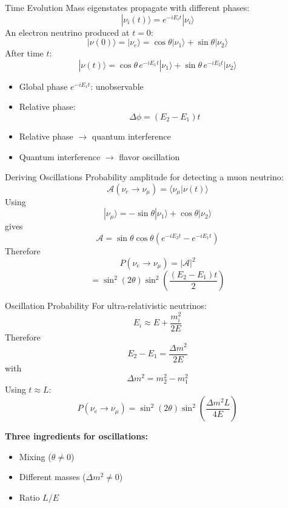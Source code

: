 \documentclass{beamer}
\begin{document}
\begin{frame}{Time Evolution}
Mass eigenstates propagate with different phases:
\[
|\nu_i(t)\rangle
=
e^{-iE_it}
|\nu_i\rangle
\]
An electron neutrino produced at $t=0$:
\[
|\nu(0)\rangle
=
|\nu_e\rangle
=
\cos\theta |\nu_1\rangle
+
\sin\theta |\nu_2\rangle
\]
After time $t$:
\[
|\nu(t)\rangle
=
\cos\theta\,e^{-iE_1t}|\nu_1\rangle
+
\sin\theta\,e^{-iE_2t}|\nu_2\rangle
\]


\begin{itemize}
    \item Global phase $e^{-iE_1t}$: unobservable
    \item Relative phase:
    \[
    \Delta\phi=(E_2-E_1)t
    \]
    \item Relative phase $\rightarrow$ quantum interference
    \item Quantum interference $\rightarrow$ flavor oscillation
\end{itemize}
\end{frame}

\begin{frame}{Deriving Oscillations}
Probability amplitude for detecting a muon neutrino:
\[
\mathcal{A}(\nu_e\rightarrow\nu_\mu)
=
\langle\nu_\mu|\nu(t)\rangle
\]
Using
\[
|\nu_\mu\rangle
=
-\sin\theta |\nu_1\rangle
+
\cos\theta |\nu_2\rangle
\]
gives
\[
\mathcal{A}
=
\sin\theta\cos\theta
\left(
e^{-iE_2t}
-
e^{-iE_1t}
\right)
\]
Therefore
\[
P(\nu_e\rightarrow\nu_\mu)
=
|\mathcal{A}|^2
\]
\[
=
\sin^2(2\theta)
\sin^2\left(
\frac{(E_2-E_1)t}{2}
\right)
\]
\end{frame}

\begin{frame}{Oscillation Probability}
For ultra-relativistic neutrinos:
\[
E_i
\approx
E+\frac{m_i^2}{2E}
\]
Therefore
\[
E_2-E_1
=
\frac{\Delta m^2}{2E}
\]
with
\[
\Delta m^2
=
m_2^2-m_1^2
\]
Using $t\approx L$:
\[
P(\nu_e\rightarrow\nu_\mu)
=
\sin^2(2\theta)
\sin^2\left(
\frac{\Delta m^2L}{4E}
\right)
\]

\vspace{0.3cm}
\textbf{Three ingredients for oscillations:}
\begin{itemize}
\item Mixing ($\theta\neq0$)
\item Different masses ($\Delta m^2\neq0$)
\item Ratio $L/E$
\end{itemize}
\end{frame}
\end{document}
